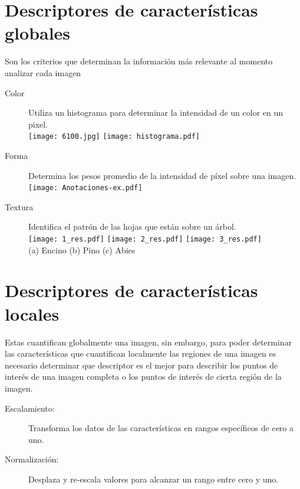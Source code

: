 \documentclass[a0,portrait]{a0poster}
\begin{document}
\begin{multicols}{2}
\section*{Descriptores de características globales}
Son los criterios que determinan la información más relevante al momento analizar cada imagen
\begin{description}

\item[Color]{Utiliza un histograma para determinar la intensidad de un color en un pixel.}\\

\hspace*{50mm}\texttt{[image: 6100.jpg]}
   \texttt{[image: histograma.pdf]}
\item[Forma]{Determina los pesos promedio de la intensidad de píxel sobre una imagen.}\\

   \hspace*{80mm}\texttt{[image: Anotaciones-ex.pdf]}
   
\item[Textura]{Identifica el patrón de las hojas que están sobre un árbol.}\\

\hspace*{25mm}\texttt{[image: 1\_res.pdf]}
\texttt{[image: 2\_res.pdf]}
\texttt{[image: 3\_res.pdf]}\\
\hspace*{50mm}(a) Encino \hspace*{40mm} (b) Pino \hspace*{30mm} (c) Abies
\end{description}

\section*{Descriptores de características locales}
Estas cuantifican globalmente una imagen, sin embargo, para poder determinar las características que cuantifican localmente las regiones de una imagen es necesario determinar que descriptor es el mejor para describir los puntos de interés de una imagen completa o los puntos de interés de cierta región de la imagen.
\bigskip
\begin{description}
\item[Escalamiento:]{Transforma los datos de las características en rangos específicos de cero a uno.}
\item[Normalización:]{Desplaza y re-escala valores para alcanzar un rango entre cero y uno.}


\end{description}
\end{multicols}
\end{document}
